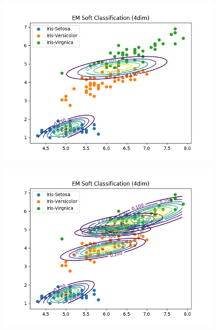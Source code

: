 \documentclass[a4paper]{article}
\begin{document}
\begin{figure}[htp]
\centering
\begin{minipage}{0.4\textwidth}
  \includegraphics[scale=0.5]{plots/gauss_sc2_c2.png}
  \label{fig:16}
\end{minipage}
\hfill
\begin{minipage}{0.4\textwidth}
  \includegraphics[scale=0.5]{plots/gauss_sc2_c5.png}
  \label{fig:17}
\end{minipage}
\end{figure} 
\end{document}
